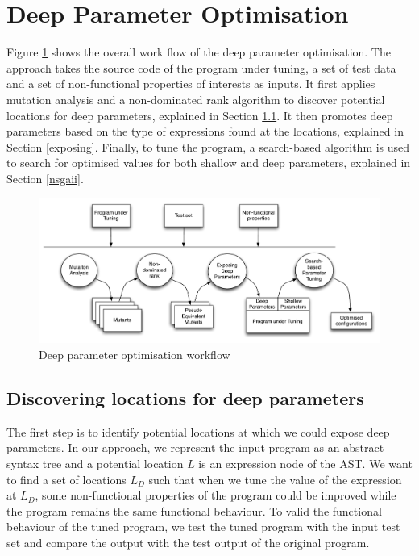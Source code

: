 \section{Deep Parameter Optimisation}

Figure \ref{system} shows the overall work flow of the deep parameter optimisation. The approach takes the source code of the program under tuning, a set of test data and a set of non-functional properties of interests as inputs. 
It first applies mutation analysis and a non-dominated rank algorithm to discover potential locations for deep parameters, explained in Section \ref{discovering}. It then promotes deep parameters based on the type of expressions found at the locations, explained in Section \ref{exposing}. Finally, to tune the program, a search-based algorithm is used to search for optimised values for both shallow and deep parameters, explained in Section \ref{nsgaii}.

\begin{figure}[htbp]
\centering
\includegraphics[width=6.2in]{pics/new_system}
\caption{Deep parameter optimisation workflow}\label{system}
\end{figure}

\subsection{Discovering locations for deep parameters}
\label{discovering}
The first step is to identify potential locations at which we could expose deep parameters. 
In our approach, we represent the input program as an abstract syntax tree and a potential location $L$ is an expression node of the AST. 
We want to find a set of locations $L_D$ such that when we tune the value of the expression at $L_D$, some non-functional properties of the program could be improved while the program remains the same functional behaviour. 
To valid the functional behaviour of the tuned program, we test the tuned program with the input test set and compare the output with the test output of the original program.

